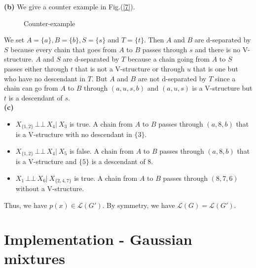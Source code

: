 \documentclass[10pt]{article}
\newcommand{\indep}{\ensuremath{\,\bot\!\!\!\bot\,}} %
\begin{document}
\textbf{(b) }We give a counter example in Fig.(\ref{7}). 
\begin{figure}[h!]
\centering
{}
\caption{Counter-example}
\label{fig7}
\end{figure}
We set $A=\{a\}, B=\{b\}, S=\{s\}$ and $T=\{t\}$. Then $A$ and $B$ are d-separated by $S$ because every chain that goes from $A$ to $B$ passes through $s$ and there is no V-structure. $A$ and $S$ are d-separated by $T$ because a chain going from $A$ to $S$ passes either through $t$ that is not a V-structure or through $u$ that is one but who have no descendant in $T$. But $A$ and $B$ are not d-separated by $T$ since a chain can go from $A$ to $B$ through $(a,u,s,b)$ and $(a,u,s)$ is a V-structure but $t$ is a descendant of $s$.\\





\textbf{(c) }
\begin{itemize}
\item $X_{\{1,2\}} \indep X_4 |\ X_3$ is true. A chain from $A$ to $B$ passes through $(a,8,b)$ that is a V-structure with no descendant in $\{3\}$.

\item $X_{\{1,2\}} \indep X_4 |\ X_5$ is false. A chain from $A$ to $B$ passes through $(a,8,b)$ that is a V-structure and $\{5\}$ is a descendant of 8.

\item $X_1 \indep X_6 |\ X_{\{ 2,4,7 \}}$ is true. A chain from $A$ to $B$ passes through $(8,7,6)$ without a V-structure.
\end{itemize}



Thus, we have $p(x) \in \mathcal{L}(G')$. By symmetry, we have $\mathcal{L}(G) = \mathcal{L}(G')$.


\section{Implementation - Gaussian mixtures\\}
\end{document}
